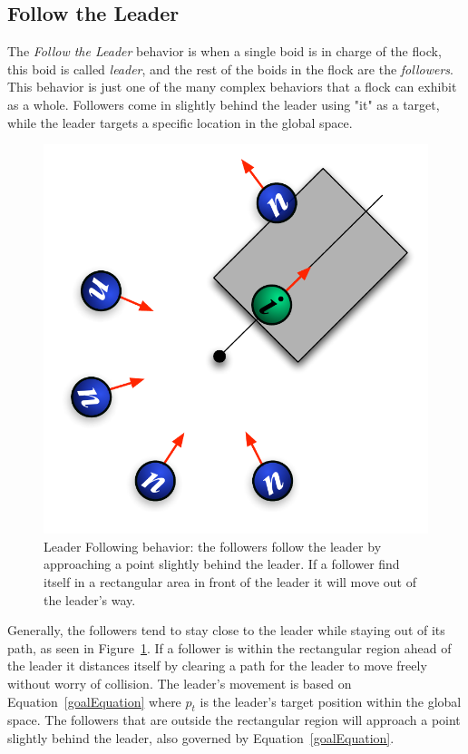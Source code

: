 \subsection{Follow the Leader}
The \textit{Follow the Leader} behavior is when a single boid is in charge of the flock, this boid is called \textit{leader}, and the rest of the boids in the flock are the \textit{followers}. This behavior is just one of the many complex behaviors that a flock can exhibit as a whole. Followers come in slightly behind the leader using "it" as a target, while the leader targets a specific location in the global space.

\begin{figure}[htbp]
\begin{center}
\includegraphics[scale=0.75]{figures/leaderFollowing.pdf}
\caption{Leader Following behavior: the followers follow the leader by approaching a point slightly behind the leader. If a follower find itself in a rectangular area in front of the leader it will move out of the leader's way.}
\label{leaderPDF}
\end{center}
\end{figure}

Generally, the followers tend to stay close to the leader while staying out of its path, as seen in Figure~\ref{leaderPDF}. If a follower is within the rectangular region ahead of the leader it distances itself by clearing a path for the leader to move freely without worry of collision. The leader's movement is  based on Equation~\ref{goalEquation} where $p_t$ is the leader's target position within the global space. The followers that are outside the rectangular region will approach a point slightly behind the leader, also governed by Equation~\ref{goalEquation}.

